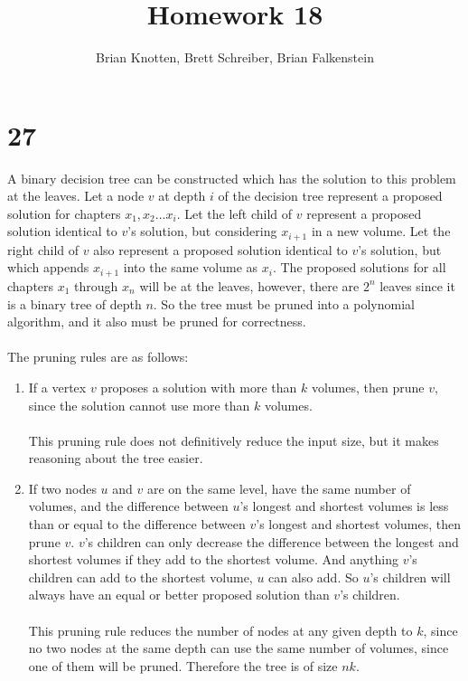 \documentclass[letterpaper,notitlepage,twoside]{article}
\begin{document}
\title{Homework 18}
\author{Brian Knotten, Brett Schreiber, Brian Falkenstein}
\maketitle

\section*{27}
A binary decision tree can be constructed which has the solution to this
problem at the leaves. Let a node $v$ at depth $i$ of the decision tree
represent a proposed solution for chapters $x_1, x_2... x_i$. Let the left
child of $v$ represent a proposed solution identical to $v$'s solution, but
considering $x_{i + 1}$ in a new volume. Let the right child of $v$ also
represent a proposed solution identical to $v$'s solution, but which appends
$x_{i + 1}$ into the same volume as $x_i$. The proposed solutions for all
chapters $x_1$ through $x_n$ will be at the leaves, however, there are $2^n$
leaves since it is a binary tree of depth $n$. So the tree must be pruned into
a polynomial algorithm, and it also must be pruned for correctness.
\\\\
The pruning rules are as follows:
\begin{enumerate}
    \item If a vertex $v$ proposes a solution with more than $k$ volumes,
        then prune $v$, since the solution cannot use more than $k$ volumes.
        \\\\
        This pruning rule does not definitively reduce the input size, but it
        makes reasoning about the tree easier.

    \item If two nodes $u$ and $v$ are on the same level, have the same
        number of volumes, and the difference between $u$'s longest and
        shortest volumes is less than or equal to the difference between $v$'s
        longest and shortest volumes, then prune $v$. $v$'s children can only
        decrease the difference between the longest and shortest volumes if
        they add to the shortest volume. And anything $v$'s children can add
        to the shortest volume, $u$ can also add. So $u$'s children will always
        have an equal or better proposed solution than $v$'s children.
        \\\\
        This pruning rule reduces the number of nodes at any given depth to $k$,
        since no two nodes at the same depth can use the same number of volumes,
        since one of them will be pruned. Therefore the tree is of size $nk$.
\end{enumerate}
\end{document}
